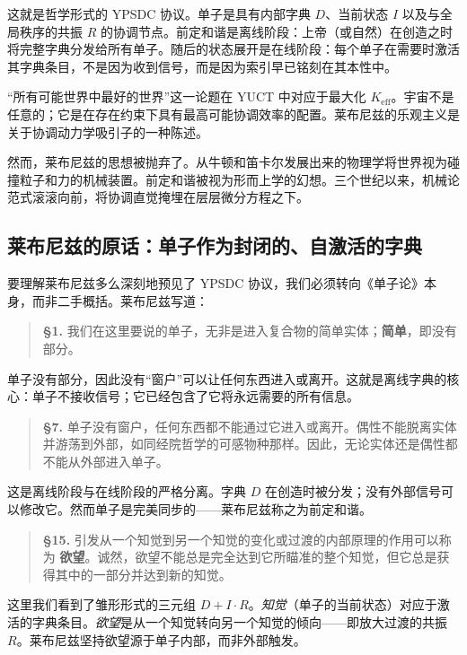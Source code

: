 \documentclass[12pt,a4paper]{article}
\begin{document}
	这就是哲学形式的 YPSDC 协议。单子是具有内部字典 \(D\)、当前状态 \(I\) 以及与全局秩序的共振 \(R\) 的协调节点。前定和谐是离线阶段：上帝（或自然）在创造之时将完整字典分发给所有单子。随后的状态展开是在线阶段：每个单子在需要时激活其字典条目，不是因为收到信号，而是因为索引早已铭刻在其本性中。
	
	“所有可能世界中最好的世界”这一论题在 YUCT 中对应于最大化 \(K_{\mathrm{eff}}\)。宇宙不是任意的；它是在存在约束下具有最高可能协调效率的配置。莱布尼兹的乐观主义是关于协调动力学吸引子的一种陈述。
	
	然而，莱布尼兹的思想被抛弃了。从牛顿和笛卡尔发展出来的物理学将世界视为碰撞粒子和力的机械装置。前定和谐被视为形而上学的幻想。三个世纪以来，机械论范式滚滚向前，将协调直觉掩埋在层层微分方程之下。
	
	\subsection{莱布尼兹的原话：单子作为封闭的、自激活的字典}
	
	要理解莱布尼兹多么深刻地预见了 YPSDC 协议，我们必须转向《单子论》本身，而非二手概括。莱布尼兹写道：
	
	\begin{quote}
		\textbf{§1.} 我们在这里要说的单子，无非是进入复合物的简单实体；\textbf{简单}，即没有部分。
	\end{quote}
	
	单子没有部分，因此没有“窗户”可以让任何东西进入或离开。这就是离线字典的核心：单子不接收信号；它已经包含了它将永远需要的所有信息。
	
	\begin{quote}
		\textbf{§7.} 单子没有窗户，任何东西都不能通过它进入或离开。偶性不能脱离实体并游荡到外部，如同经院哲学的可感物种那样。因此，无论实体还是偶性都不能从外部进入单子。
	\end{quote}
	
	这是离线阶段与在线阶段的严格分离。字典 \(D\) 在创造时被分发；没有外部信号可以修改它。然而单子是完美同步的——莱布尼兹称之为前定和谐。
	
	\begin{quote}
		\textbf{§15.} 引发从一个知觉到另一个知觉的变化或过渡的内部原理的作用可以称为 \textbf{欲望}。诚然，欲望不能总是完全达到它所瞄准的整个知觉，但它总是获得其中的一部分并达到新的知觉。
	\end{quote}
	
	这里我们看到了雏形形式的三元组 \(D+I\cdot R\)。\emph{知觉}（单子的当前状态）对应于激活的字典条目。\emph{欲望}是从一个知觉转向另一个知觉的倾向——即放大过渡的共振 \(R\)。莱布尼兹坚持欲望源于单子内部，而非外部触发。
	
\end{document}

